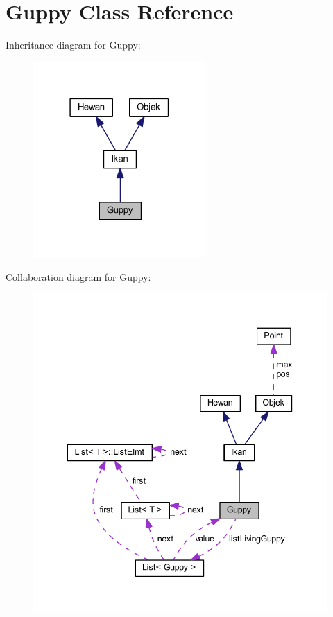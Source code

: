 \hypertarget{class_guppy}{}\section{Guppy Class Reference}
\label{class_guppy}


Inheritance diagram for Guppy\+:\nopagebreak
\begin{figure}[H]
\begin{center}
\leavevmode
\includegraphics[width=186pt]{class_guppy__inherit__graph}
\end{center}
\end{figure}


Collaboration diagram for Guppy\+:\nopagebreak
\begin{figure}[H]
\begin{center}
\leavevmode
\includegraphics[width=341pt]{class_guppy__coll__graph}
\end{center}
\end{figure}
